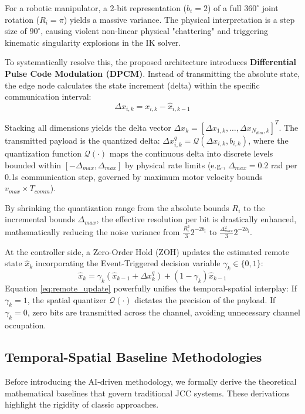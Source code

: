 For a robotic manipulator, a 2-bit representation ($b_i=2$) of a full $360^\circ$ joint rotation ($R_i = \pi$) yields a massive variance. The physical interpretation is a step size of $90^\circ$, causing violent non-linear physical "chattering" and triggering kinematic singularity explosions in the IK solver.

To systematically resolve this, the proposed architecture introduces \textbf{Differential Pulse Code Modulation (DPCM)}. Instead of transmitting the absolute state, the edge node calculates the state increment (delta) within the specific communication interval:
\begin{equation}
    \Delta x_{i,k} = x_{i,k} - \hat{x}_{i,k-1}
\end{equation}

Stacking all dimensions yields the delta vector $\Delta x_k = [\Delta x_{1,k}, \dots, \Delta x_{N_{dim},k}]^T$. The transmitted payload is the quantized delta: $\Delta x_{i,k}^q = \mathcal{Q}(\Delta x_{i,k}, b_{i,k})$, where the quantization function $\mathcal{Q}(\cdot)$ maps the continuous delta into discrete levels bounded within $[-\Delta_{max}, \Delta_{max}]$ by physical rate limits (e.g., $\Delta_{max}=0.2$ rad per 0.1s communication step, governed by maximum motor velocity bounds $v_{max} \times T_{comm}$). 

By shrinking the quantization range from the absolute bounds $R_i$ to the incremental bounds $\Delta_{max}$, the effective resolution per bit is drastically enhanced, mathematically reducing the noise variance from $\frac{R_i^2}{3} 2^{-2b_i}$ to $\frac{\Delta_{max}^2}{3} 2^{-2b_i}$.

At the controller side, a Zero-Order Hold (ZOH) updates the estimated remote state $\hat{x}_k$ incorporating the Event-Triggered decision variable $\gamma_k \in \{0,1\}$:
\begin{equation} \label{eq:remote_update}
    \hat{x}_k = \gamma_k (\hat{x}_{k-1} + \Delta x_k^q) + (1 - \gamma_k) \hat{x}_{k-1}
\end{equation}
Equation \ref{eq:remote_update} powerfully unifies the temporal-spatial interplay: If $\gamma_k=1$, the spatial quantizer $\mathcal{Q}(\cdot)$ dictates the precision of the payload. If $\gamma_k=0$, zero bits are transmitted across the channel, avoiding unnecessary channel occupation.

\subsection{Temporal-Spatial Baseline Methodologies}
Before introducing the AI-driven methodology, we formally derive the theoretical mathematical baselines that govern traditional JCC systems. These derivations highlight the rigidity of classic approaches.

